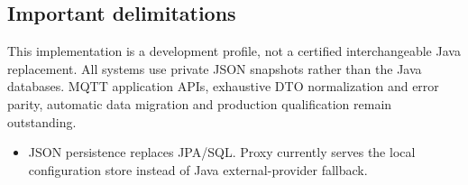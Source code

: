 \documentclass[a4paper]{arrowhead}
\begin{document}
\subsection{Important delimitations}
This implementation is a development profile, not a certified interchangeable Java replacement. All systems use private JSON snapshots rather than the Java databases. MQTT application APIs, exhaustive DTO normalization and error parity, automatic data migration and production qualification remain outstanding.
\begin{itemize}
\item JSON persistence replaces JPA/SQL. Proxy currently serves the local configuration store instead of Java external-provider fallback.
\end{itemize}
\end{document}
